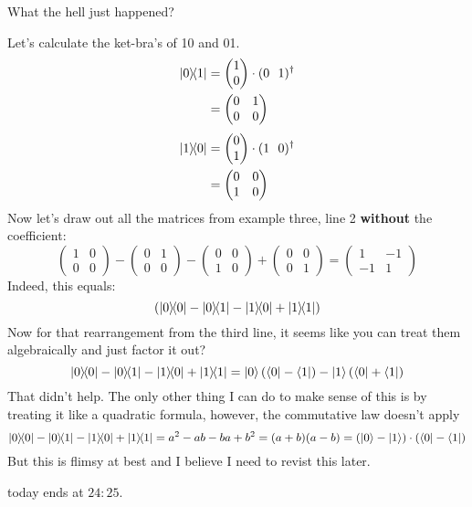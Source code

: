 \begin{mdframed}[hidealllines=true,backgroundcolor=black!60, fontcolor = white]
\begin{center}What the hell just happened?\end{center}
Let's calculate the ket-bra's of 10 and 01.
\begin{align*}
    \ketbra{0}{1} &= \begin{pmatrix}
    1 \\
    0
    \end{pmatrix} \cdot (0 \ \ 1)^\dagger\\
    &=\begin{pmatrix}
    0 & 1 \\
    0 & 0 
    \end{pmatrix}\\
\end{align*}
\begin{align*}
    \ketbra{1}{0} &= \begin{pmatrix}
    0 \\
    1
    \end{pmatrix} \cdot (1 \ \ 0)^\dagger\\
    &=\begin{pmatrix}
    0 & 0 \\
    1 & 0 
    \end{pmatrix}\\
\end{align*}
Now let's draw out all the matrices from example three, line 2 \textbf{without} the coefficient:
$$
\begin{pmatrix} 
1 & 0 \\ 
0 & 0
\end{pmatrix}
-
\begin{pmatrix}
0 & 1 \\
0 & 0 
\end{pmatrix}
-
\begin{pmatrix}
0 & 0 \\
1 & 0 
\end{pmatrix}
+
\begin{pmatrix} 
0 & 0 \\ 
0 & 1
\end{pmatrix}
=
\begin{pmatrix} 
1 & -1 \\ 
-1 & 1
\end{pmatrix}
$$
Indeed, this equals:
$$
(\ketbra{0}{0} - \ketbra{0}{1} -     \ketbra{1}{0} + \ketbra{1}{1})
$$
Now for that rearrangement from the third line, it seems like you can treat them algebraically and just factor it out?
$$
\ketbra{0}{0} - \ketbra{0}{1} -     \ketbra{1}{0} + \ketbra{1}{1} = \ket{0}(\bra{0} - \bra{1}) - \ket{1}(\bra{0}+\bra{1}) 
$$
That didn't help. The only other thing I can do to make sense of this is by treating it like a quadratic formula, however, the commutative law doesn't apply
$$
\ketbra{0}{0} - \ketbra{0}{1} -     \ketbra{1}{0} + \ketbra{1}{1} = a^2 - ab - ba + b^2 = (a+b)(a-b) = (\ket{0}-\ket{1})\cdot (\bra{0}-\bra{1})
$$
But this is flimsy at best and I believe I need to revist this later.
\end{mdframed}

today ends at $24:25$.